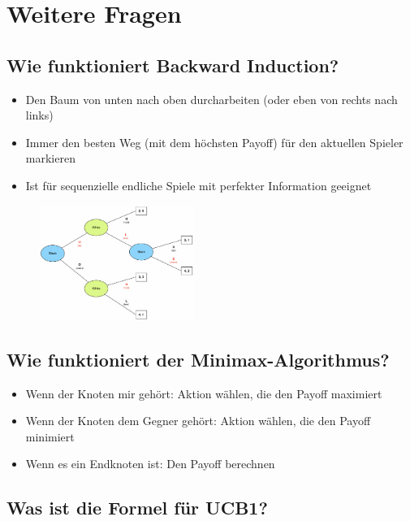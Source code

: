 \documentclass[a4paper]{article}
\begin{document}
	\section{Weitere Fragen}
	
		\subsection{Wie funktioniert Backward Induction?}
		
		\begin{itemize}
			\item Den Baum von unten nach oben durcharbeiten (oder eben von rechts nach links)
			\item Immer den besten Weg (mit dem höchsten Payoff) für den aktuellen Spieler markieren
			\item Ist für sequenzielle endliche Spiele mit perfekter Information geeignet
		\end{itemize}
		
		\begin{figure}[htb!]
			\centering
			\includegraphics[width=0.45\textwidth]{img/backward_induction.png}
		\end{figure}
		
		\subsection{Wie funktioniert der Minimax-Algorithmus?}
		
		\begin{itemize}
			\item Wenn der Knoten mir gehört: Aktion wählen, die den Payoff maximiert
			\item Wenn der Knoten dem Gegner gehört: Aktion wählen, die den Payoff minimiert
			\item Wenn es ein Endknoten ist: Den Payoff berechnen
		\end{itemize}
		
		\subsection{Was ist die Formel für UCB1?}
		
\end{document}
